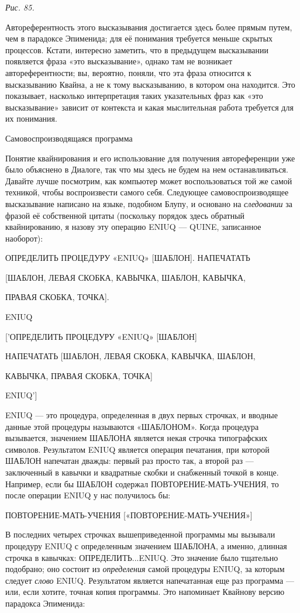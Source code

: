 \documentclass[../main.tex]{subfiles}
\begin{document}
\emph{Рис. 85.}

Автореферентность этого высказывания достигается здесь более прямым путем, чем в парадоксе Эпименида; для её понимания требуется меньше скрытых процессов. Кстати, интересно заметить, что в предыдущем высказывании появляется фраза «это высказывание», однако там не возникает автореферентности; вы, вероятно, поняли, что эта фраза относится к высказыванию Квайна, а не к тому высказыванию, в котором она находится. Это показывает, насколько интерпретация таких указательных фраз как «это высказывание» зависит от контекста и какая мыслительная работа требуется для их понимания.

Самовоспроизводящаяся программа

Понятие квайнирования и его использование для получения автореференции уже было объяснено в Диалоге, так что мы здесь не будем на нем останавливаться. Давайте лучше посмотрим, как компьютер может воспользоваться той же самой техникой, чтобы воспроизвести самого себя. Следующее самовоспроизводящее высказывание написано на языке, подобном Блупу, и основано на \emph{следовании} за фразой её собственной цитаты (поскольку порядок здесь обратный квайнированию, я назову эту операцию ENIUQ --- QUINE, записанное наоборот):

ОПРЕДЕЛИТЬ ПРОЦЕДУРУ «ENIUQ» {[}ШАБЛОН{]}. НАПЕЧАТАТЬ

{[}ШАБЛОН, ЛЕВАЯ СКОБКА, КАВЫЧКА, ШАБЛОН, КАВЫЧКА,

ПРАВАЯ СКОБКА, ТОЧКА{]}.

ENIUQ

{[}'ОПРЕДЕЛИТЬ ПРОЦЕДУРУ «ENIUQ» {[}ШАБЛОН{]}

НАПЕЧАТАТЬ {[}ШАБЛОН, ЛЕВАЯ СКОБКА, КАВЫЧКА, ШАБЛОН,

КАВЫЧКА, ПРАВАЯ СКОБКА, ТОЧКА{]}

ENIUQ'{]}

ENIUQ --- это процедура, определенная в двух первых строчках, и вводные данные этой процедуры называются «ШАБЛОНОМ». Когда процедура вызывается, значением ШАБЛОНА является некая строчка типографских символов. Результатом ENIUQ является операция печатания, при которой ШАБЛОН напечатан дважды: первый раз просто так, а второй раз --- заключенный в кавычки и квадратные скобки и снабженный точкой в конце. Например, если бы ШАБЛОН содержал ПОВТОРЕНИЕ-МАТЬ-УЧЕНИЯ, то после операции ENIUQ у нас получилось бы:

ПОВТОРЕНИЕ-МАТЬ-УЧЕНИЯ {[}«ПОВТОРЕНИЕ-МАТЬ-УЧЕНИЯ»{]}

В последних четырех строчках вышеприведенной программы мы вызывали процедуру ENIUQ с определенным значением ШАБЛОНА, а именно, длинная строчка в кавычках: ОПРЕДЕЛИТЬ...ENIUQ. Это значение было тщательно подобрано; оно состоит из \emph{определения} самой процедуры ENIUQ, за которым следует \emph{слово} ENIUQ. Результатом является напечатанная еще раз программа --- или, если хотите, точная копия программы. Это напоминает Квайнову версию парадокса Эпименида:
\end{document}
